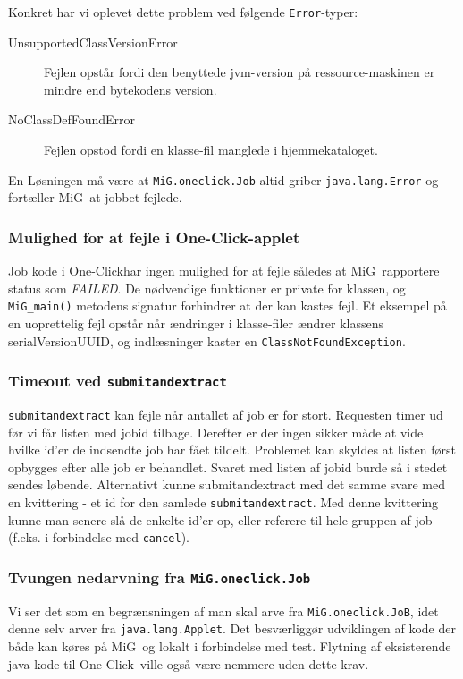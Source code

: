 \documentclass[final,a4paper,11pt]{article}
\newcommand{\mig}{MiG}
\newcommand{\oc}{One-Click}
\begin{document}
Konkret har vi oplevet dette problem ved følgende \texttt{Error}-typer:
\begin{description}
	\item[UnsupportedClassVersionError]	Fejlen opstår fordi den benyttede jvm-version på ressource-maskinen er mindre end bytekodens version.
	\item[NoClassDefFoundError]	Fejlen opstod fordi en klasse-fil manglede i hjemmekataloget.  
\end{description}

En Løsningen må være at \texttt{MiG.oneclick.Job} altid griber \texttt{java.lang.Error} og fortæller \mig\ at jobbet fejlede.

\subsubsection*{Mulighed for at fejle i \oc-applet}
Job kode i \oc har ingen mulighed for at fejle således at \mig\ rapportere status som \emph{FAILED}. De nødvendige funktioner er private for klassen, og \texttt{MiG\_main()} metodens signatur forhindrer at der kan kastes fejl. Et eksempel på en uoprettelig fejl opstår når ændringer i klasse-filer ændrer klassens serialVersionUUID, og indlæsninger kaster en \texttt{ClassNotFoundException}.

\subsubsection*{Timeout ved \texttt{submitandextract}}
\texttt{submitandextract} kan fejle når antallet af job er for stort. Requesten timer ud før vi får listen med jobid tilbage. Derefter er der ingen sikker måde at vide hvilke id'er de indsendte job har fået tildelt. 
Problemet kan skyldes at listen først opbygges efter alle job er behandlet. Svaret med listen af jobid burde så i stedet sendes løbende. Alternativt kunne submitandextract med det samme svare med en kvittering - et id for den samlede \texttt{submitandextract}. Med denne kvittering kunne man senere slå de enkelte id'er op, eller referere til hele gruppen af job (f.eks. i forbindelse med \texttt{cancel}).

\subsubsection*{Tvungen nedarvning fra \texttt{MiG.oneclick.Job}}
Vi ser det som en begrænsningen af man skal arve fra \texttt{MiG.oneclick.JoB}, idet denne selv arver fra \texttt{java.lang.Applet}. Det besværliggør udviklingen af kode der både kan køres på \mig\ og lokalt i forbindelse med test. Flytning af eksisterende java-kode til \oc\ ville også være nemmere uden dette krav.
\end{document}
